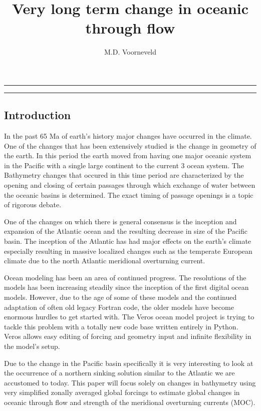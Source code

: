 \documentclass[a4paper]{article}
\title{Very long term change in oceanic through flow}
\author{M.D. Voorneveld}
\begin{document}
\maketitle
\noindent\rule{\textwidth}{1pt}
\begin{abstract}

\end{abstract}
\noindent\rule{\textwidth}{1pt}
\begin{multicols}{2}
\section{Introduction}

In the past 65 Ma of earth's history major changes have occurred in the climate. One of the changes that has been extensively studied is the change in geometry of the earth\cite{besse2002apparent}. In this period the earth moved from having one major oceanic system in the Pacific with a single large continent to the current 3 ocean system. The Bathymetry changes that occured in this time period are characterized by the opening and closing of certain passages through which exchange of water between the oceanic basins is determined. The exact timing of passage openings is a topic of rigorous debate\cite{Scher2006Apr}\cite{Schmidt2007Jan}.


One of the changes on which there is general consensus is the inception and expansion of the Atlantic ocean and the resulting decrease in size of the Pacific basin. The inception of the Atlantic has had major effects on the earth's climate especially resulting in massive localized changes such as the temperate European climate due to the north Atlantic meridional overturning current.


Ocean modeling has been an area of continued progress. The resolutions of the models has been increasing steadily since the inception of the first digital ocean models. However, due to the age of some of these models and the continued adaptation of often old legacy Fortran code, the older models have become enormous hurdles to get started with. The Veros \cite{Hafner2018Aug} ocean model project is trying to tackle this problem with a totally new code base written entirely in Python. Veros allows easy editing of forcing and geometry input and infinite flexibility in the model's setup.

Due to the change in the Pacific basin specifically it is very interesting to look at the occurrence of a northern sinking solution similar to the Atlantic we are accustomed to today.
This paper will focus solely on changes in bathymetry using very simplified zonally averaged global forcings to estimate global changes in oceanic through flow and strength of the meridional overturning currents (MOC).





\end{multicols}
\end{document}
